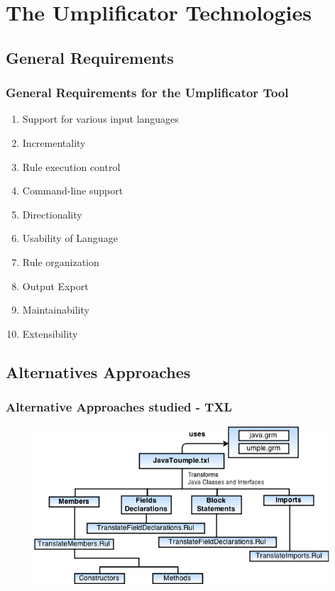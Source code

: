 \documentclass[xcolor=table]{beamer}
\begin{document}
\section{The Umplificator Technologies}

\subsection{General Requirements} 
\begin{frame}
\frametitle{General Requirements for the Umplificator Tool}
\begin{enumerate}
\item Support for various input languages

\item Incrementality

\item Rule execution control

\item Command-line support 

\item Directionality

\item Usability of Language
 
\item Rule organization

\item Output Export

\item Maintainability 

\item Extensibility
\end{enumerate}
\end{frame}

\subsection{Alternatives Approaches} 
\begin{frame}
\frametitle{Alternative Approaches studied - TXL}
\centering
\begin{figure}[h]
\centering
\includegraphics[width=0.98\textwidth]{Figures/TXLSTRUCTURE.png} 
\end{figure}
\end{frame}
\end{document}
